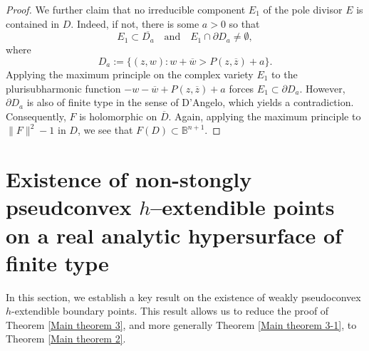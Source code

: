 \documentclass[a4paper,centertags,oneside,12pt]{amsart}
\newcommand{\ov}{\overline}
\numberwithin{equation}{section}
\begin{document}
\begin{proof}
 We further claim that no irreducible component \(E_1\) of the pole divisor \(E\) is contained in ${D}$. Indeed, if not, there is some \(a>0\)  so that  
\[
E_1\subset\overline{D_a}\quad\text{and}\quad E_1\cap\partial D_a\neq\emptyset,
\]
where  
\[
D_a:=\{(z,w): w+\overline w>P(z, \overline z)+a\}.
\]
Applying the maximum principle on the complex variety \(E_1\) to the plurisubharmonic function \(-w-\overline w+P(z, \overline z)+a\) forces \(E_1\subset\partial D_a\). However, \(\partial D_a\) is also of finite type in the sense of D’Angelo, which yields a contradiction. Consequently, \(F\) is holomorphic on \(\ov{D}\). Again, applying  the maximum principle to $\|F\|^2-1$ in $D$, we see that
$F(D)\subset {\mathbb B}^{n+1}$.
\end{proof}



\section{ Existence of non-stongly pseudconvex $h$--extendible  points on  a real analytic hypersurface of finite type}

In this section, we establish a key result on the existence of weakly pseudoconvex $h$-extendible boundary points. This result allows us to reduce the proof of Theorem \ref{Main theorem 3}, and more generally Theorem \ref{Main theorem 3-1}, to Theorem \ref{Main theorem 2}.
\end{document}

